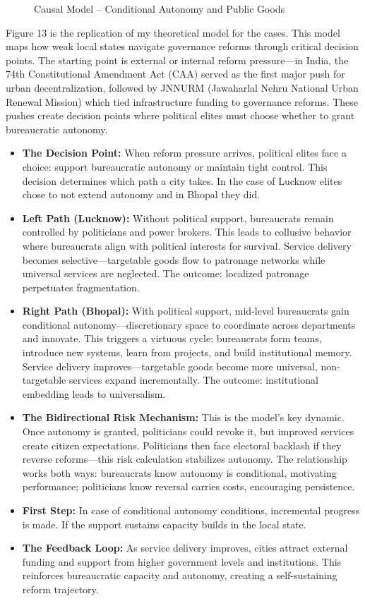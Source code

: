 \begin{figure}[htbp]
\centering
\caption{Causal Model – Conditional Autonomy and Public Goods}
\label{fig:causal_model}
\end{figure}

Figure 13 is the replication of my theoretical model for the cases. This model maps how weak local states navigate governance reforms through critical decision points. The starting point is external or internal reform pressure—in India, the 74th Constitutional Amendment Act (CAA) served as the first major push for urban decentralization, followed by JNNURM (Jawaharlal Nehru National Urban Renewal Mission) which tied infrastructure funding to governance reforms. These pushes create decision points where political elites must choose whether to grant bureaucratic autonomy.

\begin{itemize}
\item \textbf{The Decision Point:} When reform pressure arrives, political elites face a choice: support bureaucratic autonomy or maintain tight control. This decision determines which path a city takes. In the case of Lucknow elites chose to not extend autonomy and in Bhopal they did.
\item \textbf{Left Path (Lucknow):} Without political support, bureaucrats remain controlled by politicians and power brokers. This leads to collusive behavior where bureaucrats align with political interests for survival. Service delivery becomes selective—targetable goods flow to patronage networks while universal services are neglected. The outcome: localized patronage perpetuates fragmentation.
\item \textbf{Right Path (Bhopal):} With political support, mid-level bureaucrats gain conditional autonomy—discretionary space to coordinate across departments and innovate. This triggers a virtuous cycle: bureaucrats form teams, introduce new systems, learn from projects, and build institutional memory. Service delivery improves—targetable goods become more universal, non-targetable services expand incrementally. The outcome: institutional embedding leads to universalism.
\item \textbf{The Bidirectional Risk Mechanism:} This is the model's key dynamic. Once autonomy is granted, politicians could revoke it, but improved services create citizen expectations. Politicians then face electoral backlash if they reverse reforms—this risk calculation stabilizes autonomy. The relationship works both ways: bureaucrats know autonomy is conditional, motivating performance; politicians know reversal carries costs, encouraging persistence.
\item \textbf{First Step:} In case of conditional autonomy conditions, incremental progress is made. If the support sustains capacity builds in the local state.
\item \textbf{The Feedback Loop:} As service delivery improves, cities attract external funding and support from higher government levels and institutions. This reinforces bureaucratic capacity and autonomy, creating a self-sustaining reform trajectory.
\end{itemize}

